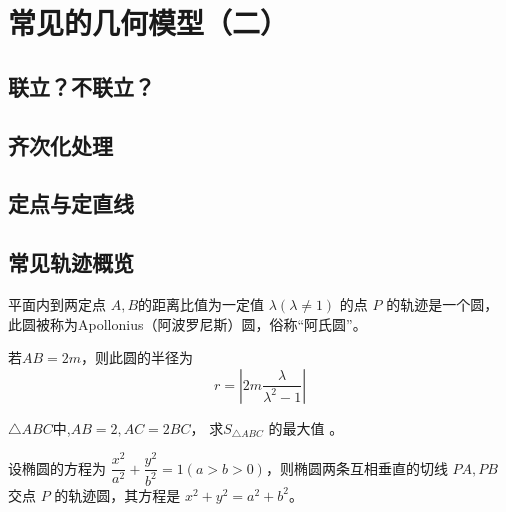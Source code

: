 \clearpage


\section{常见的几何模型（二）}
\subsection{联立？不联立？}
\clearpage
\subsection{齐次化处理}
\clearpage
\subsection{定点与定直线}
\clearpage
\subsection{常见轨迹概览}
\begin{theorem}[Apollonius圆]
    平面内到两定点  $A, B  $的距离比值为一定值 $ \lambda(\lambda \neq 1) $ 的点 $ P$  的轨迹是一个圆，此圆被称为Apollonius（阿波罗尼斯）圆，俗称“阿氏圆”。

    若\(AB=2m\)，则此圆的半径为
    \begin{equation}
        r=\left|2m\frac{\lambda}{\lambda^2-1}\right|
    \end{equation}
\end{theorem}
\begin{example}
    $\triangle A B C $中,$A B=2, A C=2 B C $， 求$ S_{\triangle A B C}$ 的最大值 。
\end{example}

\begin{theorem}[Monge圆]
    设椭圆的方程为 $\dfrac{x^2}{a^2} + \dfrac{y^2}{b^2} = 1 (a > b > 0)$，则椭圆两条互相垂直的切线 $PA, PB$ 交点 $P$ 的轨迹圆，其方程是 $x^2 + y^2 = a^2 + b^2$。
\end{theorem}


